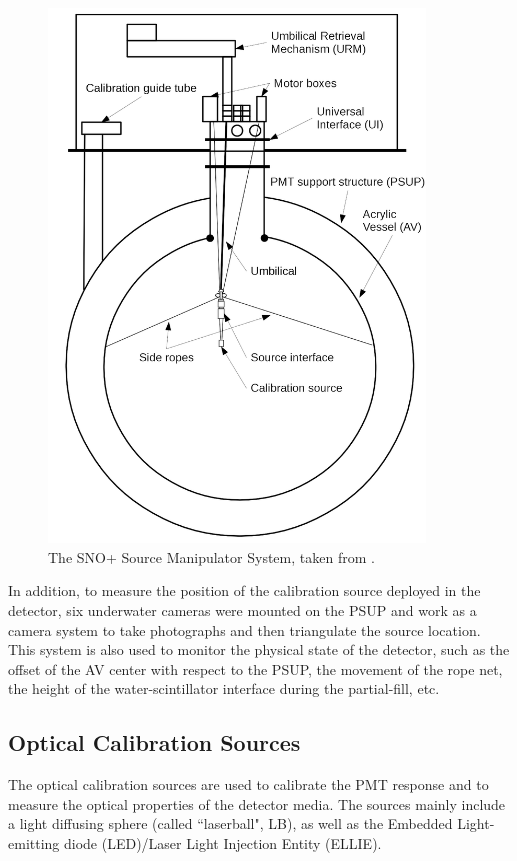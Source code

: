 \begin{figure}[!htb]
	\centering
	\includegraphics[width=10cm]{SMS.png}
	\caption{The SNO+ Source Manipulator System, taken from \cite{snop_jinst}.}
	\label{sms}
\end{figure}

In addition, to measure the position of the calibration source deployed in the detector, six underwater cameras were mounted on the PSUP and work as a camera system to take photographs and then triangulate the source location. This system is also used to monitor the physical state of the detector, such as the offset of the AV center with respect to the PSUP, the movement of the rope net, the height of the water-scintillator interface during the partial-fill, etc\cite{singh2020underwater,snop_jinst}.

\subsection{Optical Calibration Sources}
The optical calibration sources are used to calibrate the PMT response and to measure the optical properties of the detector media. The sources mainly include a light diffusing sphere (called ``laserball", LB), as well as the Embedded Light-emitting diode (LED)/Laser Light Injection Entity (ELLIE).

